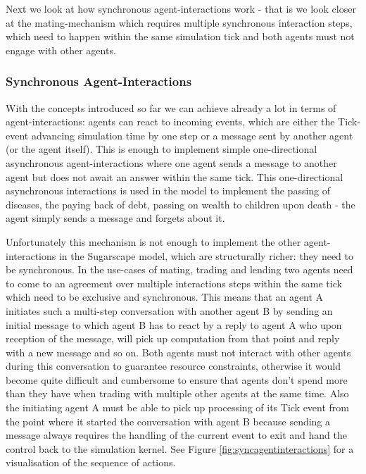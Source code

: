 Next we look at how synchronous agent-interactions work - that is we look closer at the mating-mechanism which requires multiple synchronous interaction steps, which need to happen within the same simulation tick and both agents must not engage with other agents.

\subsubsection{Synchronous Agent-Interactions}
With the concepts introduced so far we can achieve already a lot in terms of agent-interactions: agents can react to incoming events, which are either the Tick-event advancing simulation time by one step or a message sent by another agent (or the agent itself). This is enough to implement simple one-directional asynchronous agent-interactions where one agent sends a message to another agent but does not await an answer within the same tick. This one-directional asynchronous interactions is used in the model to implement the passing of diseases, the paying back of debt, passing on wealth to children upon death - the agent simply sends a message and forgets about it.

Unfortunately this mechanism is not enough to implement the other agent-interactions in the Sugarscape model, which are structurally richer: they need to be synchronous. In the use-cases of mating, trading and lending two agents need to come to an agreement over multiple interactions steps within the same tick which need to be exclusive and synchronous.  This means that an agent A initiates such a multi-step conversation with another agent B by sending an initial message to which agent B has to react by a reply to agent A who upon reception of the message, will pick up computation from that point and reply with a new message and so on. Both agents must not interact with other agents during this conversation to guarantee resource constraints, otherwise it would become quite difficult and cumbersome to ensure that agents don't spend more than they have when trading with multiple other agents at the same time. Also the initiating agent A must be able to pick up processing of its Tick event from the point where it started the conversation with agent B because sending a message always requires the handling of the current event to exit and hand the control back to the simulation kernel. See Figure \ref{fig:syncagentinteractions} for a visualisation of the sequence of actions.


